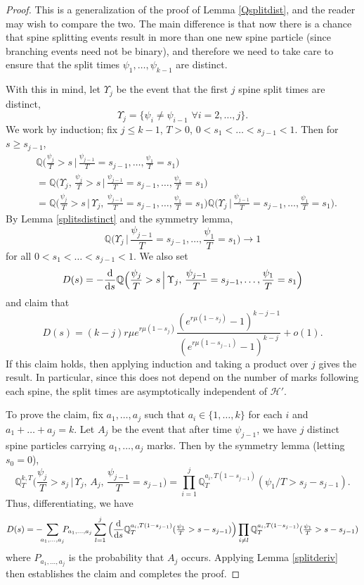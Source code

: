 \documentclass{article}
\theoremstyle{plain}
\theoremstyle{definition}
\newcommand{\Q}{\mathbb{Q}}
\renewcommand{\d}{{\rm{d}}}
\begin{document}
\begin{proof}
This is a generalization of the proof of Lemma \ref{Qsplitdist}, and the reader may wish to compare the two. The main difference is that now there is a chance that spine splitting events result in more than one new spine particle (since branching events need not be binary), and therefore we need to take care to ensure that the split times $\psi_1,\ldots,\psi_{k-1}$ are distinct.

With this in mind, let $\Upsilon_j$ be the event that the first $j$ spine split times are distinct,
\[\Upsilon_j = \{\psi_i \neq \psi_{i-1} \,\,\forall i=2,\ldots, j\}.\]
We work by induction; fix $j\le k-1$, $T>0$, $0<s_1<\ldots<s_{j-1}<1$. Then for $s\ge s_{j-1}$,
\begin{align*}
&\Q\Big( \frac{\psi_j}{T} > s \,\Big|\, \frac{\psi_{j-1}}{T} = s_{j-1},\ldots, \frac{\psi_1}{T} = s_1\Big)\\
&= \Q\Big( \Upsilon_j,\, \frac{\psi_j}{T} > s \,\Big|\, \frac{\psi_{j-1}}{T} = s_{j-1},\ldots, \frac{\psi_1}{T} = s_1\Big)\\
&= \Q\Big( \frac{\psi_j}{T} > s \,\Big|\,\Upsilon_j,\, \frac{\psi_{j-1}}{T} = s_{j-1},\ldots, \frac{\psi_1}{T} = s_1\Big)\Q\Big( \Upsilon_j \,\Big|\, \frac{\psi_{j-1}}{T} = s_{j-1},\ldots, \frac{\psi_1}{T} = s_1\Big).
\end{align*}
By Lemma \ref{splitsdistinct} and the symmetry lemma,
\[\Q\Big( \Upsilon_j \,\Big|\, \frac{\psi_{j-1}}{T} = s_{j-1},\ldots, \frac{\psi_1}{T} = s_1\Big) \to 1\]
for all $0<s_1<\ldots<s_{j-1}<1$. We also set
\[D(s) = - \frac{\d}{\d s} \Q\Big( \frac{\psi_j}{T} > s \,\Big|\,\Upsilon_j,\, \frac{\psi_{j-1}}{T} = s_{j-1},\ldots, \frac{\psi_1}{T} = s_1\Big)\]
and claim that
\[D(s) = (k-j) r\mu e^{r\mu(1-s_j)} \frac{(e^{r\mu(1-s_j)}-1)^{k-j-1}}{(e^{r\mu(1-s_{j-1})}-1)^{k-j}} + o(1).\]
If this claim holds, then applying induction and taking a product over $j$ gives the result. In particular, since this does not depend on the number of marks following each spine, the split times are asymptotically independent of $\mathcal H'$.

To prove the claim, fix $a_1,\ldots,a_j$ such that $a_i\in\{1,\ldots,k\}$ for each $i$ and $a_1+\ldots+a_j = k$. Let $A_j$ be the event that after time $\psi_{j-1}$, we have $j$ distinct spine particles carrying $a_1,\ldots,a_j$ marks. Then by the symmetry lemma (letting $s_0=0$),
\[\Q^{k,T}_T\Big(\frac{\psi_j}{T} > s_j \,\Big|\,\Upsilon_j,\,A_j,\, \frac{\psi_{j-1}}{T} = s_{j-1}\Big) = \prod_{i=1}^j \Q^{a_i,T(1-s_{j-1})}_T(\psi_1/T > s_j-s_{j-1}).\]
Thus, differentiating, we have
\[D(s)= -\hspace{-1.5mm}\sum_{a_1,\ldots,a_j}\hspace{-1.5mm} P_{a_1,\ldots,a_j} \sum_{l=1}^j \Big(\frac{\d}{\d s} \Q^{a_i,T(1-s_{j-1})}_T(\tfrac{\psi_1}{T} > s-s_{j-1})\Big) \prod_{i\neq l} \Q^{a_i,T(1-s_{j-1})}_T(\tfrac{\psi_1}{T} > s-s_{j-1})\]
where $P_{a_1,\ldots,a_j}$ is the probability that $A_j$ occurs. Applying Lemma \ref{splitderiv} then establishes the claim and completes the proof.
\end{proof}
\end{document}
